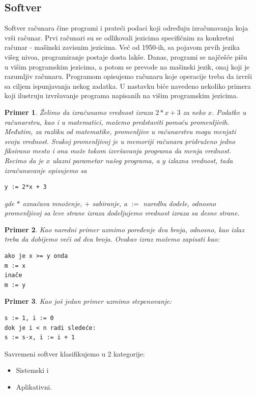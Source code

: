 \documentclass[a4paper]{article}
\newtheorem{primer}{Primer}[section]
\begin{document}
{\subsection{Softver}
Softver računara čine programi i prateći podaci koji određuju izračunavanja koja vrši računar.
Prvi računari su se odlikovali jezicima specifičnim za konkretni računar - mašinski zavisnim jezicima. Već od 1950-ih, sa pojavom prvih jezika višeg nivoa, programiranje postaje dosta lakše. Danas, programi se najčešće pišu u višim programskim jezicima, a potom se prevode na mašinski jezik, onaj koji je razumljiv računaru. Programom opisujemo računaru koje operacije treba da izvrši sa ciljem ispunjavanja nekog zadatka. U nastavku biće navedeno nekoliko primera koji ilustruju izvršavanje programa napisanih na višim programskim jezicima. 
\begin{primer}
Želimo da izračunamo vrednost izraza $2*x + 3$ za neko $x$. Podatke u računarstvu, kao i u matematici, možemo predstaviti pomoću promenljivih. Međutim, za razliku od matematike, promenljive u računarstvu mogu menjati svoju vrednost. Svakoj promenljivoj je u memoriji računara pridruženo jedno fiksirano mesto i ona može tokom izvršavanja programa da menja vrednost. Recimo da je $x$ ulazni parametar našeg programa, a $y$ izlazna vrednost, tada izračunavanje opisujemo sa
\begin{verbatim}
y := 2*x + 3
\end{verbatim}
gde $*$ označava množenje, $+$ sabiranje, a $:=$ naredbu dodele, odnosno promenljivoj sa leve strane izraza dodeljujemo vrednost izraza sa desne strane.
\end{primer}
\begin{primer}
Kao naredni primer uzmimo poređenje dva broja, odnosno, kao izlaz treba da dobijemo veći od dva broja.
Ovakav izraz možemo zapisati kao:
\begin{verbatim}
ako je x >= y onda
m := x
inače
m := y
\end{verbatim}
\end{primer}
\begin{primer}
Kao još jedan primer uzmimo stepenovanje:
\begin{verbatim}
s := 1, i := 0
dok je i < n radi sledeće:
s := s·x, i := i + 1
\end{verbatim}
\end{primer}
Savremeni softver klasifikujemo u 2 kategorije:
\begin{itemize}
\item Sistemski i
\item Aplikativni.

\end{itemize}}
\end{document}
